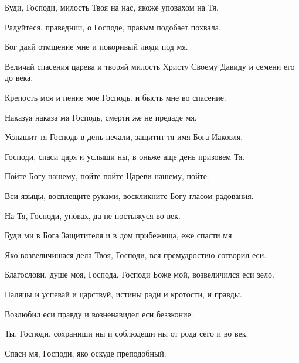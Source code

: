 \begin{mymulticols}


 Буди, Господи, милость Твоя на нас, якоже уповахом на Тя.

 Радуйтеся, праведнии, о Господе, правым подобает похвала.

 Бог даяй отмщение мне и покоривый люди под мя.

 Величай спасения царева и творяй милость Христу Своему Давиду и семени его до века.

 Крепость моя и пение мое Господь. и бысть мне во спасение.

 Наказуя наказа мя Господь, смерти же не предаде мя.

 Услышит тя Господь в день печали, защитит тя имя Бога Иаковля.

 Господи, спаси царя и услыши ны, в оньже аще день призовем Тя.

 Пойте Богу нашему, пойте пойте Цареви нашему, пойте.

 Вси языцы, восплещите руками, воскликните Богу гласом радования.

 На Тя, Господи, уповах, да не постыжуся во век.

 Буди ми в Бога Защитителя и в дом прибежища, еже спасти мя.

 Яко возвеличишася дела Твоя, Господи, вся премудростию сотворил еси.

 Благослови, душе моя, Господа, Господи Боже мой, возвеличился еси зело.

 Наляцы и успевай и царствуй, истины ради и кротости, и правды.

 Возлюбил еси правду и возненавидел еси беззконие.

 Ты, Господи, сохраниши ны и соблюдеши ны от рода сего и во век.

 Спаси мя, Господи, яко оскуде преподобный.


\end{mymulticols}
